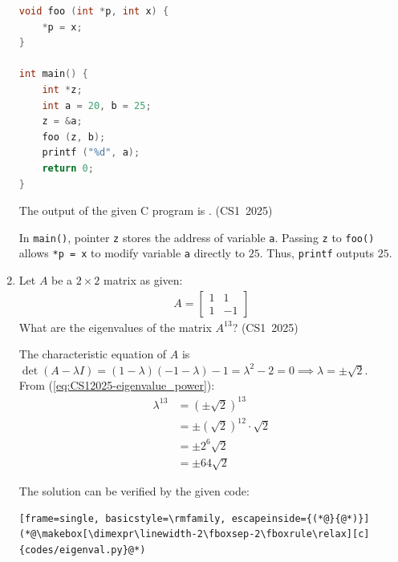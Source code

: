 \begin{enumerate}[label=\thesubsection.\arabic*, ref=\thesubsection.\theenumi]
\begin{lstlisting}[language=C]
void foo (int *p, int x) {
    *p = x;
}

int main() {
    int *z;
    int a = 20, b = 25;
    z = &a;
    foo (z, b);
    printf ("%d", a);
    return 0;
}
\end{lstlisting}
The output of the given C program is \underline{\hspace{1cm}}.
\hfill (CS1~2025)

\vspace{0.2cm}
\solution
In \texttt{main()}, pointer \texttt{z} stores the address of variable \texttt{a}. Passing \texttt{z} to \texttt{foo()} allows \texttt{*p = x} to modify variable \texttt{a} directly to $25$. Thus, \texttt{printf} outputs $25$.

\vspace{0.5cm}
\item Let $A$ be a $2\times2$ matrix as given:
\begin{align*}
A = \begin{bmatrix} 1 & 1 \\ 1 & -1 \end{bmatrix}
\end{align*}
What are the eigenvalues of the matrix $A^{13}$?
\hfill (CS1~2025)
\begin{enumerate}
	\begin{multicols}{2}
    \item $1, -1$
    \item $2\sqrt{2}, -2\sqrt{2}$
    \item $4\sqrt{2}, -4\sqrt{2}$
    \item $64\sqrt{2}, -64\sqrt{2}$
	\end{multicols}
\end{enumerate}

\vspace{0.2cm}
\solution
The characteristic equation of $A$ is $\det(A - \lambda I) = (1-\lambda)(-1-\lambda) - 1 = \lambda^2 - 2 = 0 \implies \lambda = \pm \sqrt{2}$. \\
From (\ref{eq:CS12025-eigenvalue_power}):
\begin{align}
\lambda^{13} &= (\pm \sqrt{2})^{13} \\
             &= \pm (\sqrt{2})^{12} \cdot \sqrt{2} \\
             &= \pm 2^6 \sqrt{2} \\
             &= \pm 64\sqrt{2}
\end{align}

The solution can be verified by the given code:
\begin{lstlisting}[frame=single, basicstyle=\rmfamily, escapeinside={(*@}{@*)}]
(*@\makebox[\dimexpr\linewidth-2\fboxsep-2\fboxrule\relax][c]{codes/eigenval.py}@*)
\end{lstlisting}


\end{enumerate}
